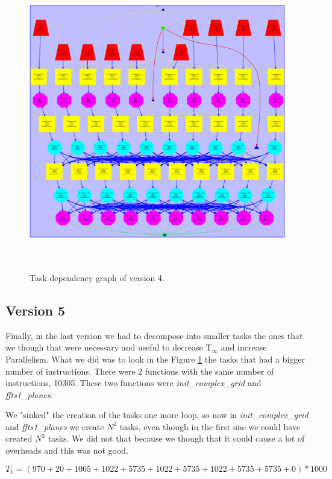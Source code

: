 \documentclass[12pt, a4paper]{article}
\begin{document}
\begin{figure}[H]
  \centering
  \includegraphics[width=15cm,height=13cm]{./images/dependency_graph_v4}
  \caption{Task dependency graph of version 4.}
  \label{dependency_graph_v4}
\end{figure}

\subsection{Version 5}

Finally, in the last version we had to decompose into smaller tasks the ones that we though that were necessary and useful to decrease T$_\infty$ and increase Parallelism. What we did was to look in the Figure \ref{dependency_graph_v4} the tasks that had a bigger number of instructions. There were 2 functions with the same number of instructions, 10305. These two functions were \textit{init\_complex\_grid} and \textit{ffts1\_planes}.

We "sinked" the creation of the tasks one more loop, so now in \textit{init\_complex\_grid} and \textit{ffts1\_planes} we create $N^2$ tasks, even though in the first one we could have created $N^3$ tasks. We did not that because we though that it could cause a lot of overheads and this was not good.

\[ T_1 = (970 + 20 + 1065 + 1022 + 5735 + 1022 + 5735 + 1022 + 5735 + 5735 + 0) * 1000 \]
\end{document}
